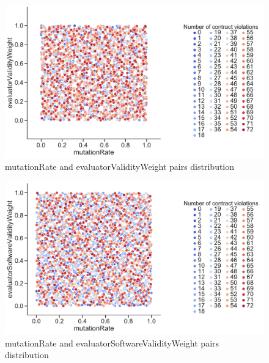 \begin{figure}
	\centering
	\includegraphics[width=\textwidth]{images/PairsDistr/mutationRate_evaluatorValidityWeight.pdf}
	\caption[mutationRate and evaluatorValidityWeight pairs distribution]{mutationRate and evaluatorValidityWeight pairs distribution}
	\label{fig:mutationRate_evaluatorValidityWeight_pair}
\end{figure}
\clearpage
\begin{figure}
	\centering
	\includegraphics[width=\textwidth]{images/PairsDistr/mutationRate_evaluatorSoftwareValidityWeight.pdf}
	\caption[mutationRate and evaluatorSoftwareValidityWeight pairs distribution]{mutationRate and evaluatorSoftwareValidityWeight pairs distribution}
	\label{fig:mutationRate_evaluatorSoftwareValidityWeight_pair}
\end{figure}
\clearpage
